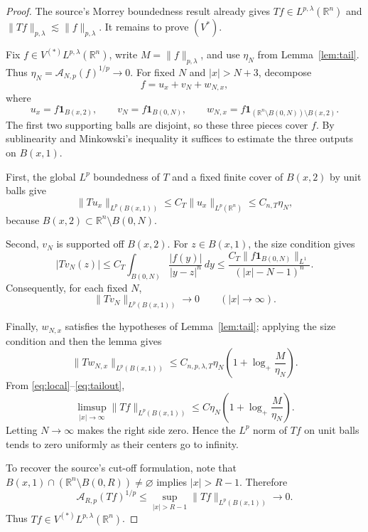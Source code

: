 \documentclass[11pt]{article}
\newcommand{\R}{\mathbb R}
\newcommand{\1}{\mathbf 1}
\newcommand{\Mor}{L^{p,\lambda}(\R^n)}
\newcommand{\Vast}{V^{(\ast)}L^{p,\lambda}(\R^n)}
\begin{document}
\begin{proof}
The source's Morrey boundedness result already gives $Tf\in\Mor$ and
$\|Tf\|_{p,\lambda}\lesssim\|f\|_{p,\lambda}$.  It remains to prove
$(V^\ast)$.

Fix $f\in\Vast$, write $M=\|f\|_{p,\lambda}$, and use $\eta_N$ from
Lemma~\ref{lem:tail}.  Thus $\eta_N=\mathcal A_{N,p}(f)^{1/p}\to0$.
For fixed $N$ and $|x|>N+3$, decompose
\[
 f=u_x+v_N+w_{N,x},
\]
where
\[
 u_x=f\1_{B(x,2)},\qquad
 v_N=f\1_{B(0,N)},\qquad
 w_{N,x}=f\1_{(\R^n\setminus B(0,N))\setminus B(x,2)}.
\]
The first two supporting balls are disjoint, so these three pieces cover
$f$.  By sublinearity and Minkowski's inequality it suffices to estimate the
three outputs on $B(x,1)$.

First, the global $L^p$ boundedness of $T$ and a fixed finite cover of
$B(x,2)$ by unit balls give
\begin{equation}\label{eq:local}
 \|Tu_x\|_{L^p(B(x,1))}
 \leq C_T\|u_x\|_{L^p(\R^n)}
 \leq C_{n,T}\eta_N,
\end{equation}
because $B(x,2)\subset\R^n\setminus B(0,N)$.

Second, $v_N$ is supported off $B(x,2)$.  For $z\in B(x,1)$, the size
condition gives
\[
 |Tv_N(z)|
 \leq C_T\int_{B(0,N)}\frac{|f(y)|}{|y-z|^n}\,dy
 \leq \frac{C_T\|f\1_{B(0,N)}\|_{L^1}}
              {( |x|-N-1)^n}.
\]
Consequently, for each fixed $N$,
\begin{equation}\label{eq:origin}
 \|Tv_N\|_{L^p(B(x,1))}\longrightarrow0
 \qquad (|x|\to\infty).
\end{equation}

Finally, $w_{N,x}$ satisfies the hypotheses of Lemma~\ref{lem:tail}; applying
the size condition and then the lemma gives
\begin{equation}\label{eq:tailout}
 \|Tw_{N,x}\|_{L^p(B(x,1))}
 \leq C_{n,p,\lambda,T}\eta_N
 \left(1+\log_+\frac{M}{\eta_N}\right).
\end{equation}
From \eqref{eq:local}--\eqref{eq:tailout},
\[
 \limsup_{|x|\to\infty}\|Tf\|_{L^p(B(x,1))}
 \leq C\eta_N\left(1+\log_+\frac{M}{\eta_N}\right).
\]
Letting $N\to\infty$ makes the right side zero.  Hence the $L^p$ norm of
$Tf$ on unit balls tends to zero uniformly as their centers go to infinity.

To recover the source's cut-off formulation, note that
$B(x,1)\cap(\R^n\setminus B(0,R))\neq\varnothing$ implies $|x|>R-1$.
Therefore
\[
 \mathcal A_{R,p}(Tf)^{1/p}
 \leq\sup_{|x|>R-1}\|Tf\|_{L^p(B(x,1))}\longrightarrow0.
\]
Thus $Tf\in\Vast$.
\end{proof}
\end{document}
